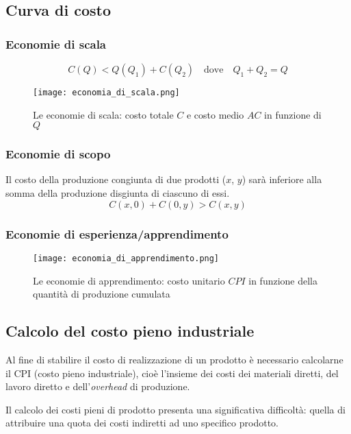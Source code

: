 \subsection{Curva di costo}

\subsubsection{Economie di scala}

\begin{equation*}
    C(Q) < Q(Q_1) + C(Q_2) \quad
    \text{dove} \quad Q_1 + Q_2 = Q
\end{equation*}
\begin{figure}[h]
    \centering
    \texttt{[image: economia\_di\_scala.png]}
    \caption{Le economie di scala: costo totale $C$ e costo medio $AC$ in
    funzione di $Q$}
\end{figure}

\subsubsection{Economie di scopo}
Il costo della produzione congiunta di due prodotti ($x$, $y$) sarà inferiore alla
somma della produzione disgiunta di ciascuno di essi.
\begin{equation*}
    C(x,0) + C(0, y) > C(x,y)
\end{equation*}

\subsubsection{Economie di esperienza/apprendimento}
\begin{figure}[h]
    \centering
    \texttt{[image: economia\_di\_apprendimento.png]}
    \caption{Le economie di apprendimento: costo unitario $CPI$ in funzione della quantità
    di produzione cumulata}
\end{figure}

\subsection{Calcolo del costo pieno industriale}
Al fine di stabilire il costo di realizzazione di un prodotto è necessario
calcolarne il \gls{CPI} (costo pieno industriale), cioè l'insieme dei costi dei materiali
diretti, del lavoro diretto e dell'\emph{overhead} di produzione.

Il calcolo dei costi pieni di prodotto presenta una significativa difficoltà:
quella di attribuire una quota dei costi indiretti ad uno specifico prodotto.

